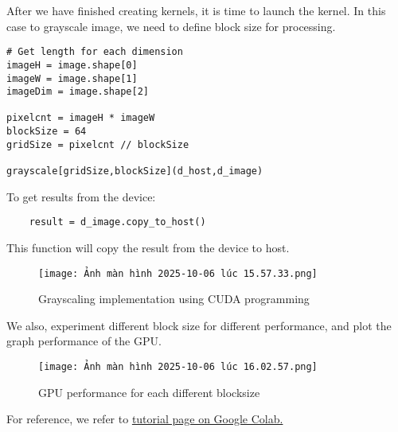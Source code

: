 \documentclass{article}
\begin{document}
After we have finished creating kernels, it is time to launch the kernel. In this case to grayscale image, we need to define block size for processing. 

\begin{verbatim}
# Get length for each dimension
imageH = image.shape[0]
imageW = image.shape[1]
imageDim = image.shape[2]

pixelcnt = imageH * imageW
blockSize = 64
gridSize = pixelcnt // blockSize

grayscale[gridSize,blockSize](d_host,d_image)
\end{verbatim}

To get results from the device: 
\begin{verbatim}
    result = d_image.copy_to_host()
\end{verbatim}

This function will copy the result from the device to host. 

\begin{figure}
    \centering
    \texttt{[image: Ảnh màn hình 2025-10-06 lúc 15.57.33.png]}
    \caption{Grayscaling implementation using CUDA programming}
    \label{fig:placeholder}
\end{figure}

We also, experiment different block size for different performance, and plot the graph performance of the GPU.

\begin{figure}
    \centering
    \texttt{[image: Ảnh màn hình 2025-10-06 lúc 16.02.57.png]}
    \caption{GPU performance for each different blocksize}
    \label{fig:placeholder}
\end{figure}

For reference, we refer to \href{https://colab.research.google.com/github/HamzaGbada/Numba-cuda/blob/main/Numba_CUDA.ipynb}{tutorial page on Google Colab.}
\end{document}
